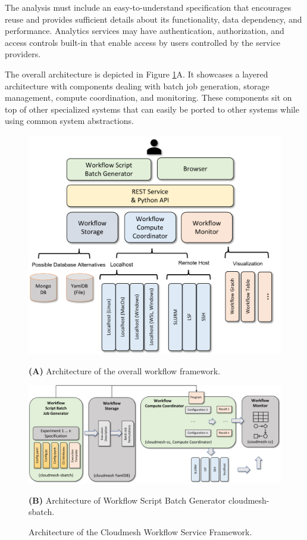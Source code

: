 \documentclass[utf8]{FrontiersinVancouver} %
\begin{document}
The analysis must include an easy-to-understand specification that encourages reuse and provides sufficient details about its functionality, data dependency, and performance. Analytics services may have authentication, authorization, and access controls built-in that enable access by users controlled by the service providers.

The overall architecture is depicted in Figure \ref{fig:cc-2}A. It showcases a layered architecture with components dealing with batch job generation, storage management, compute coordination, and monitoring. These components sit on top of other specialized systems that can easily be ported to other systems while using common system abstractions.

\begin{figure}[htb]
    \centering\includegraphics[width=0.70\columnwidth]{images/cloudmesh-cc-new}
    
    {\bf (A)} Architecture of the overall workflow framework.

\bigskip\bigskip
    
    \centering\includegraphics[width=1.0\columnwidth]{images/cloudmesh-sbatch-new}
    
    
    {\bf (B)} Architecture of Workflow Script Batch Generator cloudmesh-sbatch.

    \caption{Architecture of the Cloudmesh Workflow Service Framework.}
    \label{fig:cc-2}

\end{figure}
\end{document}
